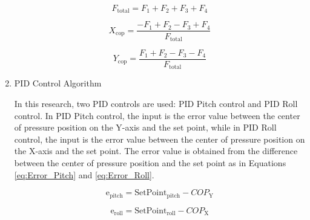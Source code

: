 \begin{enumerate}[label=\Alph*.]
    \begin{equation}
      F_{\mathrm{total}} = F_1 + F_2 + F_3 + F_4
      \label{eq:Total_Force}
    \end{equation}

    \begin{equation}
      X_{\mathrm{cop}} = \frac{- F_1 + F_2 - F_3 + F_4}{F_{\mathrm{total}}}
      \label{eq:COP_X}
    \end{equation}

    \begin{equation}
      Y_{\mathrm{cop}} = \frac{F_1 + F_2 - F_3 - F_4}{F_{\mathrm{total}}}
      \label{eq:COP_Y}
    \end{equation}

    \item PID Control Algorithm
    \label{subsec:pidcontrolalgorithm}

    \hspace*{1em} In this research, two PID controls are used: PID Pitch control and PID Roll control. In PID Pitch control, the input is the error value between the center of pressure position on the Y-axis and the set point, while in PID Roll control, the input is the error value between the center of pressure position on the X-axis and the set point. The error value is obtained from the difference between the center of pressure position and the set point as in Equations \ref{eq:Error_Pitch} and \ref{eq:Error_Roll}.

    \begin{equation}
      \mathrm{e}_{\mathrm{pitch}} = \mathrm{SetPoint}_{\mathrm{pitch}} - COP_{\mathrm{Y}}
      \label{eq:Error_Pitch}
    \end{equation}

    \begin{equation}
      \mathrm{e}_{\mathrm{roll}} = \mathrm{SetPoint}_{\mathrm{roll}} - COP_{\mathrm{X}}
      \label{eq:Error_Roll}
    \end{equation}
 
\end{enumerate}
